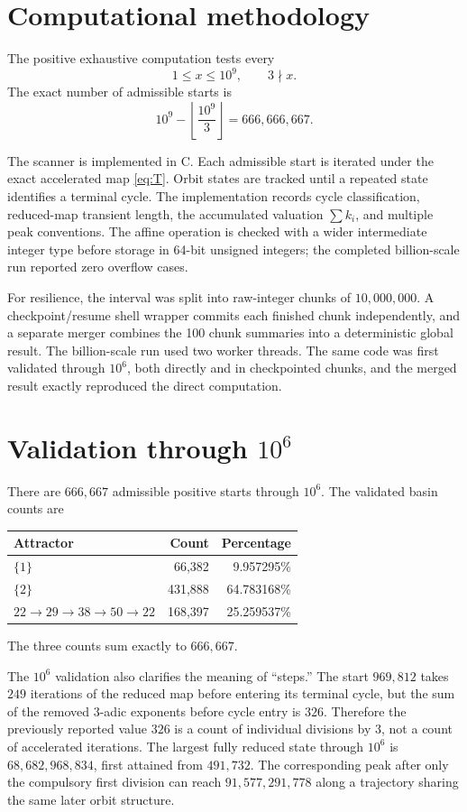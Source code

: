 \documentclass[11pt]{article}
\begin{document}
\section{Computational methodology}
The positive exhaustive computation tests every
\[
1\le x\le10^9,\qquad3\nmid x.
\]
The exact number of admissible starts is
\begin{equation}
10^9-\left\lfloor\frac{10^9}{3}\right\rfloor
=666,666,667.
\end{equation}

The scanner is implemented in C.  Each admissible start is iterated under the exact accelerated map \eqref{eq:T}.  Orbit states are tracked until a repeated state identifies a terminal cycle.  The implementation records cycle classification, reduced-map transient length, the accumulated valuation $\sum k_i$, and multiple peak conventions.  The affine operation is checked with a wider intermediate integer type before storage in 64-bit unsigned integers; the completed billion-scale run reported zero overflow cases.

For resilience, the interval was split into raw-integer chunks of $10,000,000$.  A checkpoint/resume shell wrapper commits each finished chunk independently, and a separate merger combines the 100 chunk summaries into a deterministic global result.  The billion-scale run used two worker threads.  The same code was first validated through $10^6$, both directly and in checkpointed chunks, and the merged result exactly reproduced the direct computation.

\section{Validation through $10^6$}
There are $666,667$ admissible positive starts through $10^6$.  The validated basin counts are
\begin{center}
\begin{tabular}{lrr}
\toprule
Attractor & Count & Percentage\\
\midrule
$\{1\}$ & 66,382 & 9.957295\%\\
$\{2\}$ & 431,888 & 64.783168\%\\
$22\to29\to38\to50\to22$ & 168,397 & 25.259537\%\\
\bottomrule
\end{tabular}
\end{center}
The three counts sum exactly to $666,667$.

The $10^6$ validation also clarifies the meaning of ``steps.''  The start $969,812$ takes $249$ iterations of the reduced map before entering its terminal cycle, but the sum of the removed $3$-adic exponents before cycle entry is $326$.  Therefore the previously reported value $326$ is a count of individual divisions by $3$, not a count of accelerated iterations.  The largest fully reduced state through $10^6$ is $68,682,968,834$, first attained from $491,732$.  The corresponding peak after only the compulsory first division can reach $91,577,291,778$ along a trajectory sharing the same later orbit structure.
\end{document}

